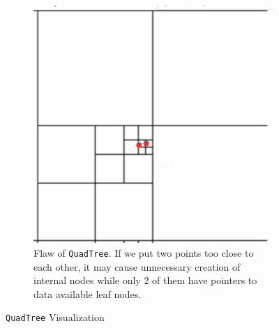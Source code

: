 \begin{center}
\begin{figure}[H]\ContinuedFloat
    \centering
    \begin{subfigure}{0.38\textwidth}
        \centering
        \includegraphics[width=\linewidth]{images/task4_quad6.png}
        \caption{Flaw of \texttt{QuadTree}. If we put two points too close to each other, it may cause unnecessary creation of internal nodes while only 2 of them have pointers to data available leaf nodes. }
        \label{fig:subfig6}
    \end{subfigure}
    \caption{\texttt{QuadTree} Visualization}
\end{figure}
\end{center}











